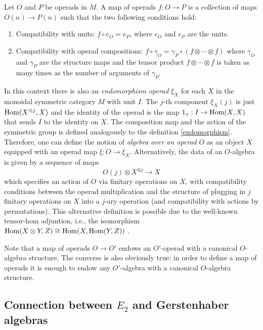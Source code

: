 \documentclass[TFM.tex]{subfiles}
\begin{document}
\begin{defi}
Let $O$ and $P$ be operads in $M$. A map of operads $f:O\to P$ is a collection of maps $O(n)\to P(n)$ such that the two following conditions hold:
\begin{enumerate}
\item Compatibility with units:  $f\circ e_O=e_P$, where $e_O$ and $e_P$ are the units.
\item Compatibility with operad compositions: $f\circ \gamma_O=\gamma_P\circ (f\otimes\cdots\otimes f)$ where $\gamma_O$ and $\gamma_P$ are the structure maps and the tensor product $f\otimes\cdots\otimes f$ is taken as many times as the number of arguments of $\gamma_P$. 
\end{enumerate}
\end{defi}



In this context there is also an \emph{endomorphism operad} $\xi_X$ for each $X$ in the monoidal symmetric category $M$ with unit $I$. The $j$-th component $\xi_X(j)$ is just $\operatorname{Hom}(X^{\otimes j},X)$ and the identity of the operad is the map $1_x:I\to \operatorname{Hom}(X,X)$ that sends $I$ to the identity on $X$. The composition map and the action of the symmetric group is defined analogously to the definition \ref{endomorphism}. Therefore, one can define the notion of \emph{algebra over an operad} $O$ as an object $X$ equipped with an operad map $\xi:O\to\xi_X$. Alternatively, the data of an $O$-algebra is given by a sequence of maps
\[
O(j) \otimes X^{\otimes j} \to X
\]
which specifies an action of $O$ via finitary operations on $X$, with compatibility conditions between the operad multiplication and the structure of plugging in $j$ finitary operations on $X$ into a $j$-ary operation (and compatibility with actions by permutations). This alternative definition is possible due to the well-known tensor-hom adjuntion, i.e., the isomorphism $\operatorname{Hom}(X\otimes Y,Z)\cong \operatorname{Hom}(X,\operatorname{Hom}(Y,Z))$ \cite{tensor-hom}.

Note that a map of operads $O\to O'$ endows an $O'$-operad with a canonical $O$-algebra structure. The converse is also obviously true: in order to define a map of operads it is enough to endow any $O'$-algebra with a canonical $O$-algebra structure. 

\subsection{Connection between $E_2$ and Gerstenhaber algebras}\label{zilber}
\end{document}

